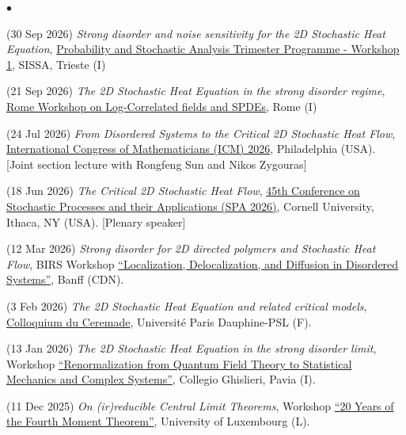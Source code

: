 \documentclass[a4paper,11pt,oneside]{amsart}
\newenvironment{myitemize}{%
\begin{list}{$\bullet$}%
 	{%
	\setlength{\itemsep}{0.3em}%
	\setlength{\topsep}{0.3em}%
	\setlength{\partopsep}{0em}%
	\setlength{\parsep}{0em}%
	\setlength{\parskip}{0em}%
	\setlength\leftmargin{1.5em}%
	\setlength\labelwidth{1.1em}%
	\setlength{\labelsep}{0.4em}%
	}%
	}%
{\end{list}}
\renewenvironment{itemize}{
\begin{myitemize}}%
{\end{myitemize}}
\begin{document}
\begin{itemize}
\item (30 Sep 2026)
\emph{Strong disorder and noise sensitivity for the 2D Stochastic Heat Equation},
\href{https://sites.google.com/view/probsissa/workshop-1}{Probability and Stochastic Analysis Trimester Programme - Workshop 1}, SISSA, Trieste (I)

\item (21 Sep 2026)
\emph{The 2D Stochastic Heat Equation in the strong disorder regime},
\href{https://sites.google.com/view/log-spde-rome/home-page}{Rome Workshop on Log-Correlated fields and SPDEs}, Rome (I)

\item (24 Jul 2026)
\emph{From Disordered Systems to the Critical 2D Stochastic Heat Flow},
\href{https://www.icm2026.org/event/ac193975-5d24-4628-8c30-ddb23de19a8b/HOME?environment=P2}{International Congress of Mathematicians (ICM) 2026},
Philadelphia (USA). {[Joint section lecture with Rongfeng Sun and Nikos Zygouras]}

\item (18 Jun 2026)
\emph{The Critical 2D Stochastic Heat Flow},
\href{https://events.ces.scl.cornell.edu/event/spa2026/summary}{45th Conference on Stochastic Processes and their Applications (SPA 2026)},
Cornell University, Ithaca, NY (USA). [Plenary speaker]

\item (12 Mar 2026)
\emph{Strong disorder for 2D directed polymers and Stochastic Heat Flow},
BIRS Workshop \href{https://www.birs.ca/events/2025/5-day-workshops/26w5634}{``Localization, Delocalization, and Diffusion in Disordered Systems''},
Banff (CDN).

\item (3 Feb 2026)
\emph{The 2D Stochastic Heat Equation and related critical models},
\href{https://www.ceremade.dauphine.fr/fr/actualites/detail-de-lactualite/article/colloquium-du-ceremade-francesco-caravenna-mardi-3-fevrier-2026.html}{Colloquium du Ceremade},
Université Paris Dauphine-PSL (F).

\item (13 Jan 2026)
\emph{The 2D Stochastic Heat Equation in the strong disorder limit}, 
Workshop \href{https://sites.google.com/universitadipavia.it/renormalizationspdes/home-page}{``Renormalization from Quantum Field Theory to Statistical Mechanics and Complex Systems''},
Collegio Ghislieri, Pavia (I).

\item (11 Dec 2025)
\emph{On (ir)reducible Central Limit Theorems},
Workshop 
\href{https://math.uni.lu/20ans/}{``20 Years of the Fourth Moment Theorem''},
University of Luxembourg (L).


\end{itemize}
\end{document}
